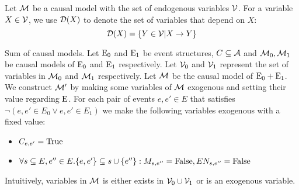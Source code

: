 \begin{notion}
    Let $\mathcal{M}$ be a causal model with the set of endogenous variables $\mathcal{V}$.
    For a variable $X \in \mathcal{V}$, we use $\mathcal{D}(X)$ to denote the set of
    variables that depend on $X$:
    \begin{equation*}
        \mathcal{D}(X) = \{Y \in \mathcal{V} | X \to Y \}
    \end{equation*}
\end{notion}

\begin{definition}
    Sum of causal models. Let $\mathrm{E}_0$ and $\mathrm{E}_1$ be event structures,
    $C \subseteq \mathcal{A}$ and $\mathcal{M}_0,\mathcal{M}_1$ be causal models of
    $\mathrm{E}_0$ and $\mathrm{E}_1$ respectively.
    Let $\mathcal{V}_0$ and $\mathcal{V}_1$ represent the set of variables in
    $\mathcal{M}_0$ and $\mathcal{M}_1$ respectively.
    Let $\mathcal{M}$ be the causal model of $\mathrm{E}_0 + \mathrm{E}_1$.
    We construct $\mathcal{M}'$ by making some variables of $\mathcal{M}$ exogenous
    and setting their value regarding $\mathrm{E}$.
    For each pair of events $e,e' \in E$ that satisfies
    $\neg (e,e' \in E_0 \vee e,e' \in E_1)$ we make the following
    variables exogenous with a fixed value:
    \begin{itemize}
        \item $C_{e,e'} = \mathrm{True}$
        \item $\forall s \subseteq E, e'' \in E. \{e,e'\}
                  \subseteq s \cup \{e''\}: M_{s,e''} = \mathrm{False}, EN_{s,e''} = \mathrm{False} $
    \end{itemize}
    Intuitively, variables in $\mathcal{M}$ is either exists in
    $\mathcal{V}_0 \cup \mathcal{V}_1$ or is an exogenous variable.
\end{definition}

